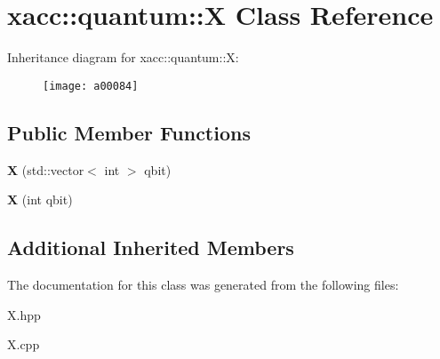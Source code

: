 \hypertarget{a00084}{}\section{xacc\+:\+:quantum\+:\+:X Class Reference}
\label{a00084}
Inheritance diagram for xacc\+:\+:quantum\+:\+:X\+:\begin{figure}[H]
\begin{center}
\leavevmode
\texttt{[image: a00084]}
\end{center}
\end{figure}
\subsection*{Public Member Functions}
\begin{DoxyCompactItemize}
\item 
{\bfseries X} (std\+::vector$<$ int $>$ qbit)\hypertarget{a00084_aedc541a302602154847118f73b040510}{}\label{a00084_aedc541a302602154847118f73b040510}

\item 
{\bfseries X} (int qbit)\hypertarget{a00084_a1159bd01929b59277b4524ccfcfd7440}{}\label{a00084_a1159bd01929b59277b4524ccfcfd7440}

\end{DoxyCompactItemize}
\subsection*{Additional Inherited Members}


The documentation for this class was generated from the following files\+:\begin{DoxyCompactItemize}
\item 
X.\+hpp\item 
X.\+cpp\end{DoxyCompactItemize}
